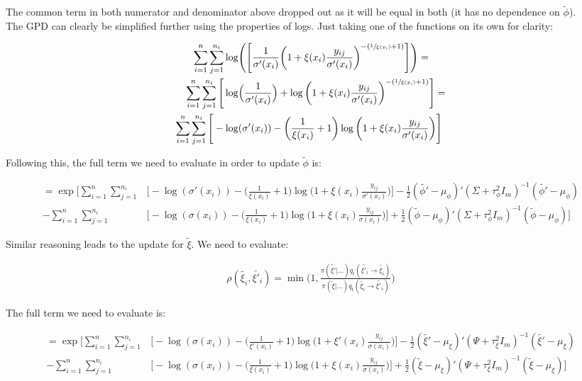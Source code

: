 \documentclass{article}
\begin{document}
The common term in both numerator and denominator above dropped out as it will be equal in both (it has no dependence on $\tilde{\phi}$). \\

The GPD can clearly be simplified further using the properties of logs. Just taking one of the functions on its own for clarity:

\begin{align*}
\sum_{i=1}^n \sum_{j=1}^{n_i} \log & \Bigg( \Bigg[ \frac{1}{\sigma'(x_i)} \bigg( 1 + \xi(x_i) \frac{y_{ij}}{\sigma'(x_i)} \bigg)^{-(\sfrac{1}{\xi(x_i)} + 1)} \Bigg] \Bigg) = \\
\sum_{i=1}^n \sum_{j=1}^{n_i} \Bigg[ \log & \Big( \frac{1}{\sigma'(x_i)} \Big) + \log \bigg( 1 + \xi(x_i) \frac{y_{ij}}{\sigma'(x_i)} \bigg)^{-(\sfrac{1}{\xi(x_i)} + 1)} \Bigg] = \\
\sum_{i=1}^n \sum_{j=1}^{n_i} \Bigg[ - \log & (\sigma'(x_i)) - \bigg( \frac{1}{\xi(x_i)} + 1 \bigg) \log \bigg( 1 + \xi(x_i) \frac{y_{ij}}{\sigma'(x_i)} \bigg) \Bigg]
\end{align*}

Following this, the full term we need to evaluate in order to update $\tilde{\phi}$ is:

\begin{align}
= \exp \Bigg[ \sum_{i=1}^n \sum_{j=1}^{n_i} & \bigg[ - \log (\sigma'(x_i)) - \bigg( \frac{1}{\xi(x_i)} + 1 \bigg) \log \bigg( 1 + \xi(x_i) \frac{y_{ij}}{\sigma'(x_i)} \bigg) \bigg] -\frac{1}{2} (\tilde{\phi'} - \mu_\phi)' (\Sigma + \tau^2_\phi I_m)^{-1} (\tilde{\phi'} - \mu_\phi) \nonumber \\
- \sum_{i=1}^n \sum_{j=1}^{n_i} & \bigg[ - \log (\sigma(x_i)) - \bigg( \frac{1}{\xi(x_i)} + 1 \bigg) \log \bigg( 1 + \xi(x_i) \frac{y_{ij}}{\sigma(x_i)} \bigg) \bigg] +\frac{1}{2} (\tilde{\phi} - \mu_\phi)' (\Sigma + \tau^2_\phi I_m)^{-1} (\tilde{\phi} - \mu_\phi) \Bigg] \label{eq:1a}
\end{align}

Similar reasoning leads to the update for $\tilde{\xi}$. We need to evaluate:

\begin{align*}
\rho(\tilde{\xi_i}, \tilde{\xi'_i}) = \min \bigg (1, \frac{\pi(\tilde{\xi'} | \dots ) q_t(\tilde{\xi'_i} \to \tilde{\xi_i})}{ \pi(\tilde{\xi} | \dots ) q_t(\tilde{\xi_i} \to \tilde{\xi'_i}) } \bigg)
\end{align*}

The full term we need to evaluate is:

\begin{align}
= \exp \Bigg[ \sum_{i=1}^n \sum_{j=1}^{n_i} & \bigg[ - \log (\sigma(x_i)) - \bigg( \frac{1}{\xi'(x_i)} + 1 \bigg) \log \bigg( 1 + \xi'(x_i) \frac{y_{ij}}{\sigma(x_i)} \bigg) \bigg] -\frac{1}{2} (\tilde{\xi'} - \mu_\xi)' (\Psi + \tau^2_\xi I_m)^{-1} (\tilde{\xi'} - \mu_\xi) \nonumber \\
- \sum_{i=1}^n \sum_{j=1}^{n_i} & \bigg[ - \log (\sigma(x_i)) - \bigg( \frac{1}{\xi(x_i)} + 1 \bigg) \log \bigg( 1 + \xi(x_i) \frac{y_{ij}}{\sigma(x_i)} \bigg) \bigg] +\frac{1}{2} (\tilde{\xi} - \mu_\xi)' (\Psi + \tau^2_\xi I_m)^{-1} (\tilde{\xi} - \mu_\xi) \Bigg] \label{eq:1b}
\end{align}
\end{document}
